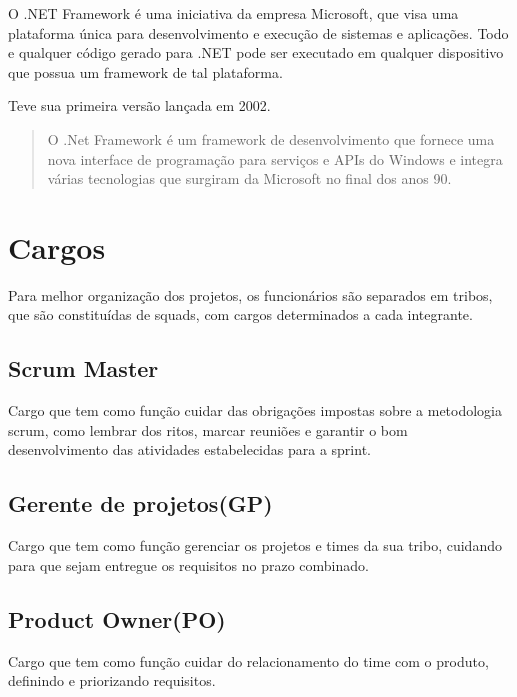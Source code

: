 O .NET Framework é uma iniciativa da empresa Microsoft, que visa uma plataforma única para desenvolvimento e execução de sistemas e aplicações.
Todo e qualquer código gerado para .NET pode ser executado em qualquer dispositivo que possua um framework de tal plataforma.

Teve sua primeira versão lançada em 2002.

\begin{quote}
  
O .Net Framework é um framework de desenvolvimento que fornece uma nova interface de programação para serviços e APIs do Windows e integra várias tecnologias que surgiram da Microsoft no final dos anos 90. \cite{thai2003net}
\end{quote}

\section{Cargos}

Para melhor organização dos projetos, os funcionários são separados em tribos, que são constituídas de squads, com cargos determinados a cada integrante.

\subsection{Scrum Master}

Cargo que tem como função cuidar das obrigações impostas sobre a metodologia scrum, como lembrar dos ritos, marcar reuniões e garantir o bom desenvolvimento das atividades estabelecidas para a sprint.

\subsection{Gerente de projetos(GP)}

Cargo que tem como função gerenciar os projetos e times da sua
 tribo, cuidando para que sejam entregue os requisitos no prazo combinado.

\subsection{Product Owner(PO)}
Cargo que tem como função cuidar do relacionamento do time com o produto,
 definindo e priorizando requisitos.

 \cite{Franca2001}